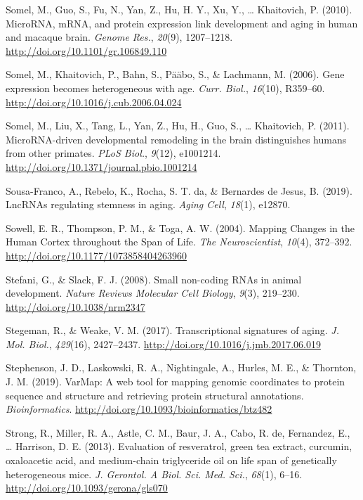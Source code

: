 \documentclass[12pt,twoside]{unicam}
\begin{document}
\begin{cslreferences}
\leavevmode\hypertarget{ref-Somel2010}{}%
Somel, M., Guo, S., Fu, N., Yan, Z., Hu, H. Y., Xu, Y., \ldots{} Khaitovich, P. (2010). MicroRNA, mRNA, and protein expression link development and aging in human and macaque brain. \emph{Genome Res.}, \emph{20}(9), 1207--1218. \url{http://doi.org/10.1101/gr.106849.110}

\leavevmode\hypertarget{ref-Somel2006}{}%
Somel, M., Khaitovich, P., Bahn, S., Pääbo, S., \& Lachmann, M. (2006). Gene expression becomes heterogeneous with age. \emph{Curr. Biol.}, \emph{16}(10), R359--60. \url{http://doi.org/10.1016/j.cub.2006.04.024}

\leavevmode\hypertarget{ref-Somel2011}{}%
Somel, M., Liu, X., Tang, L., Yan, Z., Hu, H., Guo, S., \ldots{} Khaitovich, P. (2011). MicroRNA-driven developmental remodeling in the brain distinguishes humans from other primates. \emph{PLoS Biol.}, \emph{9}(12), e1001214. \url{http://doi.org/10.1371/journal.pbio.1001214}

\leavevmode\hypertarget{ref-Sousa-Franco2019}{}%
Sousa-Franco, A., Rebelo, K., Rocha, S. T. da, \& Bernardes de Jesus, B. (2019). LncRNAs regulating stemness in aging. \emph{Aging Cell}, \emph{18}(1), e12870.

\leavevmode\hypertarget{ref-Sowell2004}{}%
Sowell, E. R., Thompson, P. M., \& Toga, A. W. (2004). Mapping Changes in the Human Cortex throughout the Span of Life. \emph{The Neuroscientist}, \emph{10}(4), 372--392. \url{http://doi.org/10.1177/1073858404263960}

\leavevmode\hypertarget{ref-Stefani2008}{}%
Stefani, G., \& Slack, F. J. (2008). Small non-coding RNAs in animal development. \emph{Nature Reviews Molecular Cell Biology}, \emph{9}(3), 219--230. \url{http://doi.org/10.1038/nrm2347}

\leavevmode\hypertarget{ref-Stegeman2017}{}%
Stegeman, R., \& Weake, V. M. (2017). Transcriptional signatures of aging. \emph{J. Mol. Biol.}, \emph{429}(16), 2427--2437. \url{http://doi.org/10.1016/j.jmb.2017.06.019}

\leavevmode\hypertarget{ref-Stephenson2019}{}%
Stephenson, J. D., Laskowski, R. A., Nightingale, A., Hurles, M. E., \& Thornton, J. M. (2019). VarMap: A web tool for mapping genomic coordinates to protein sequence and structure and retrieving protein structural annotations. \emph{Bioinformatics}. \url{http://doi.org/10.1093/bioinformatics/btz482}

\leavevmode\hypertarget{ref-Strong2013}{}%
Strong, R., Miller, R. A., Astle, C. M., Baur, J. A., Cabo, R. de, Fernandez, E., \ldots{} Harrison, D. E. (2013). Evaluation of resveratrol, green tea extract, curcumin, oxaloacetic acid, and medium-chain triglyceride oil on life span of genetically heterogeneous mice. \emph{J. Gerontol. A Biol. Sci. Med. Sci.}, \emph{68}(1), 6--16. \url{http://doi.org/10.1093/gerona/gls070}


\end{cslreferences}
\end{document}
